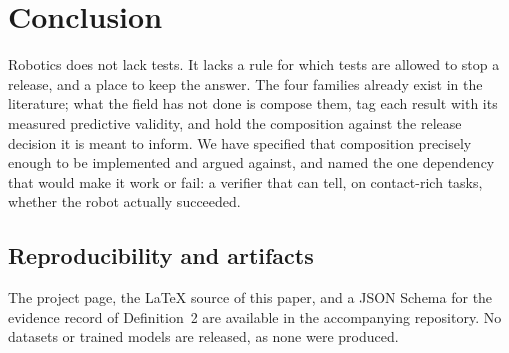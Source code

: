 \documentclass[11pt]{article}
\theoremstyle{definition}
\begin{document}
\section{Conclusion}

Robotics does not lack tests. It lacks a rule for which tests are allowed to stop a release,
and a place to keep the answer. The four families already exist in the literature; what the
field has not done is compose them, tag each result with its measured predictive validity,
and hold the composition against the release decision it is meant to inform. We have
specified that composition precisely enough to be implemented and argued against, and named
the one dependency that would make it work or fail: a verifier that can tell, on
contact-rich tasks, whether the robot actually succeeded.

\subsection*{Reproducibility and artifacts}
The project page, the LaTeX source of this paper, and a JSON Schema for the evidence record of
Definition~2 are available in the accompanying repository. No datasets or trained models are
released, as none were produced.


\end{document}
